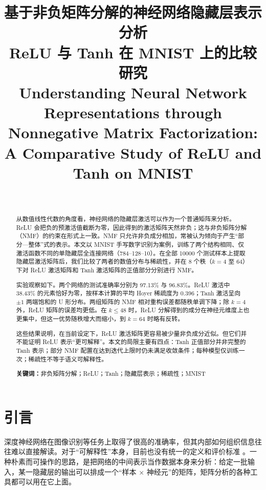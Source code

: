 \documentclass[UTF8,a4paper,11pt]{ctexart}
\title{\textbf{基于非负矩阵分解的神经网络隐藏层表示分析}\\[0.3em]
\large ReLU 与 Tanh 在 MNIST 上的比较研究\\[0.6em]
\normalsize Understanding Neural Network Representations through Nonnegative Matrix Factorization:\\
A Comparative Study of ReLU and Tanh on MNIST}
\author{\InfoAuthor\\{\small \InfoInstitute}}
\date{\InfoDate}
\begin{document}
\maketitle

\begin{abstract}
\noindent

从数值线性代数的角度看，神经网络的隐藏层激活可以作为一个普通矩阵来分析。ReLU 会把负的预激活值截断为零，因此得到的激活矩阵天然非负；这与非负矩阵分解（NMF）的约束在形式上一致。NMF 只允许非负成分相加，常被认为倾向于产生“部分—整体”式的表示。本文以 MNIST 手写数字识别为案例，训练了两个结构相同、仅激活函数不同的单隐藏层全连接网络（784--128--10）。在全部 10000 个测试样本上提取隐藏层激活矩阵后，我们比较了两者的数值分布与稀疏性，并在 8 个秩（$k=4$ 至 $64$）下对 ReLU 激活矩阵和 Tanh 激活矩阵的正值部分分别进行 NMF。

实验观察如下。两个网络的测试准确率分别为 97.13\% 与 96.83\%。ReLU 激活中 38.43\% 的元素恰好为零，按样本计算的平均 Hoyer 稀疏度为 0.396；Tanh 激活呈向 $\pm1$ 两端饱和的 U 形分布。两组矩阵的 NMF 相对重构误差都随秩单调下降；除 $k=4$ 外，ReLU 矩阵的误差均更低。在 $k\le48$ 时，ReLU 分解得到的成分在神经元维度上也更集中，但这一优势随秩增大而缩小，到 $k=64$ 时略有反转。

这些结果说明，在当前设定下，ReLU 激活矩阵更容易被少量非负成分近似。但它们并不能证明 ReLU 表示“更可解释”。本文的局限主要有四点：Tanh 正值部分并非完整的 Tanh 表示；部分 NMF 配置在达到迭代上限时仍未满足收敛条件；每种模型仅训练一次；稀疏性不等于语义可解释性。

\vspace{0.5em}
\noindent\textbf{关键词：}非负矩阵分解；ReLU；Tanh；隐藏层表示；稀疏性；MNIST
\end{abstract}

\newpage
\tableofcontents
\newpage

\section{引言}

深度神经网络在图像识别等任务上取得了很高的准确率，但其内部如何组织信息往往难以直接解读。对于“可解释性”本身，目前也没有统一的定义和评价标准 \cite{doshivelez2017towards}。一种朴素而可操作的思路，是把网络的中间表示当作数据本身来分析：给定一批输入，某一隐藏层的输出可以排成一个“样本 $\times$ 神经元”的矩阵，矩阵分析的各种工具都可以用在它上面。
\end{document}
